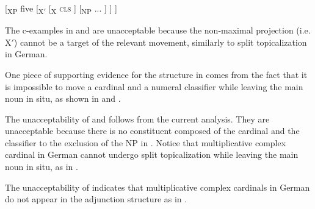 \documentclass[output=paper]{langscibook}
\begin{document}
\ea\label{tat:ho}
{[}\textsubscript{XP} five [\textsubscript{X$'$} [\textsubscript{X} \textsc{cls} ] [\textsubscript{NP} ... ] ] ]
\z

\noindent The c-examples in  and  are unacceptable because the non-maximal projection (i.e. X$'$) cannot be a target of the relevant movement, similarly to split topicalization in German. 

One piece of supporting evidence for the structure in  comes from the fact that it is impossible to move a cardinal and a numeral classifier while leaving the main noun in situ, as shown in  and .

\z

\noindent The unacceptability of  and  follows from the current analysis. They are unacceptable because there is no constituent composed of the cardinal and the classifier to the exclusion of the NP in . Notice that multiplicative complex cardinal in German cannot undergo split topicalization while leaving the main noun in situ, as in .

 \z

\noindent The unacceptability of  indicates that multiplicative complex cardinals in German do not appear in the adjunction structure as in .
\end{document}
